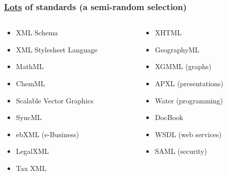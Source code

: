 

\frame
{
	\frametitle{\uline{Lots} of standards (a semi-random selection)}
	
	\begin{columns}
		\begin{column}{5cm}
			\begin{itemize}
			
				\item XML Schema
				
				\item XML Stylesheet Language
				
				\item MathML
				
				\item ChemML
				
				\item Scalable Vector Graphics
				
				\item SyncML
				
				\item ebXML (e-Business)
				
				\item LegalXML
				
				\item Tax XML
			
			\end{itemize}
		\end{column}

		\begin{column}{5cm}
			\begin{itemize}
			
				\item XHTML
				
				\item GeographyML
				
				\item XGMML (graphs)
				
				\item APXL (presentations)
				
				\item Water (programming)
				
				\item DocBook
				
				\item WSDL (web services)
				
				\item SAML (security)
				

\end{itemize}
\end{column}
\end{columns}}
